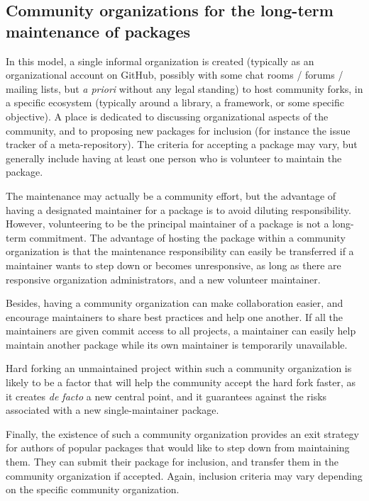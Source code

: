 \subsection{Community organizations for the long-term maintenance of packages}

\label{sec:community-org-model}

In this model, a single informal organization is created (typically as an organizational account on GitHub, possibly with some chat rooms / forums / mailing lists, but \emph{a priori} without any legal standing) to host community forks, in a specific ecosystem (typically around a library, a framework, or some specific objective).
A place is dedicated to discussing organizational aspects of the community, and to proposing new packages for inclusion (for instance the issue tracker of a meta-repository).
The criteria for accepting a package may vary, but generally include having at least one person who is volunteer to maintain the package.

The maintenance may actually be a community effort, but the advantage of having a designated maintainer for a package is to avoid diluting responsibility.
However, volunteering to be the principal maintainer of a package is not a long-term commitment.
The advantage of hosting the package within a community organization is that the maintenance responsibility can easily be transferred if a maintainer wants to step down or becomes unresponsive, as long as there are responsive organization administrators, and a new volunteer maintainer.

Besides, having a community organization can make collaboration easier, and encourage maintainers to share best practices and help one another.
If all the maintainers are given commit access to all projects, a maintainer can easily help maintain another package while its own maintainer is temporarily unavailable.

Hard forking an unmaintained project within such a community organization is likely to be a factor that will help the community accept the hard fork faster, as it creates \emph{de facto} a new central point, and it guarantees against the risks associated with a new single-maintainer package.

Finally, the existence of such a community organization provides an exit strategy for authors of popular packages that would like to step down from maintaining them.
They can submit their package for inclusion, and transfer them in the community organization if accepted.
Again, inclusion criteria may vary depending on the specific community organization.

